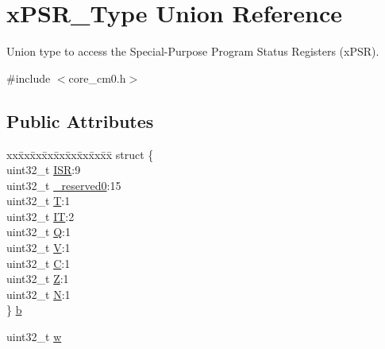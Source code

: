 \hypertarget{unionx_p_s_r___type}{}\section{x\+P\+S\+R\+\_\+\+Type Union Reference}
\label{unionx_p_s_r___type}


Union type to access the Special-\/\+Purpose Program Status Registers (x\+P\+SR).  




{\ttfamily \#include $<$core\+\_\+cm0.\+h$>$}

\subsection*{Public Attributes}
\begin{DoxyCompactItemize}
\item 
\begin{tabbing}
xx\=xx\=xx\=xx\=xx\=xx\=xx\=xx\=xx\=\kill
struct \{\\
\>uint32\_t \hyperlink{unionx_p_s_r___type_a3e9120dcf1a829fc8d2302b4d0673970}{ISR}:9\\
\>uint32\_t \hyperlink{unionx_p_s_r___type_af438e0f407357e914a70b5bd4d6a97c5}{\_reserved0}:15\\
\>uint32\_t \hyperlink{unionx_p_s_r___type_a7eed9fe24ae8d354cd76ae1c1110a658}{T}:1\\
\>uint32\_t \hyperlink{unionx_p_s_r___type_a3200966922a194d84425e2807a7f1328}{IT}:2\\
\>uint32\_t \hyperlink{unionx_p_s_r___type_add7cbd2b0abd8954d62cd7831796ac7c}{Q}:1\\
\>uint32\_t \hyperlink{unionx_p_s_r___type_af14df16ea0690070c45b95f2116b7a0a}{V}:1\\
\>uint32\_t \hyperlink{unionx_p_s_r___type_a40213a6b5620410cac83b0d89564609d}{C}:1\\
\>uint32\_t \hyperlink{unionx_p_s_r___type_a1e5d9801013d5146f2e02d9b7b3da562}{Z}:1\\
\>uint32\_t \hyperlink{unionx_p_s_r___type_a2db9a52f6d42809627d1a7a607c5dbc5}{N}:1\\
\} \hyperlink{unionx_p_s_r___type_a3b1063bb5cdad67e037cba993b693b70}{b}\\

\end{tabbing}\item 
uint32\+\_\+t \hyperlink{unionx_p_s_r___type_a1a47176768f45f79076c4f5b1b534bc2}{w}
\end{DoxyCompactItemize}


